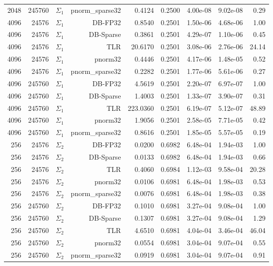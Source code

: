 \begin{tabular}{|r|r|r|r|r|r|r|r|r|}
  2048 & 245760 & $\Sigma_1$ & pnorm\_sparse32 & 0.4124 & 0.2500 & 4.00e-08 & 9.02e-08 & 0.29 \\
  4096 & 24576 & $\Sigma_1$ & DB-FP32 & 0.8540 & 0.2501 & 1.50e-06 & 4.68e-06 & 1.00 \\
  4096 & 24576 & $\Sigma_1$ & DB-Sparse & 0.3861 & 0.2501 & 4.29e-07 & 1.10e-06 & 0.45 \\
  4096 & 24576 & $\Sigma_1$ & TLR & 20.6170 & 0.2501 & 3.08e-06 & 2.76e-06 & 24.14 \\
  4096 & 24576 & $\Sigma_1$ & pnorm32 & 0.4446 & 0.2501 & 4.17e-06 & 1.48e-05 & 0.52 \\
  4096 & 24576 & $\Sigma_1$ & pnorm\_sparse32 & 0.2282 & 0.2501 & 1.77e-06 & 5.61e-06 & 0.27 \\
  4096 & 245760 & $\Sigma_1$ & DB-FP32 & 4.5619 & 0.2501 & 2.20e-07 & 6.97e-07 & 1.00 \\
  4096 & 245760 & $\Sigma_1$ & DB-Sparse & 1.4003 & 0.2501 & 1.33e-07 & 3.90e-07 & 0.31 \\
  4096 & 245760 & $\Sigma_1$ & TLR & 223.0360 & 0.2501 & 6.19e-07 & 5.12e-07 & 48.89 \\
  4096 & 245760 & $\Sigma_1$ & pnorm32 & 1.9056 & 0.2501 & 2.58e-05 & 7.71e-05 & 0.42 \\
  4096 & 245760 & $\Sigma_1$ & pnorm\_sparse32 & 0.8616 & 0.2501 & 1.85e-05 & 5.57e-05 & 0.19 \\
  256 & 24576 & $\Sigma_2$ & DB-FP32 & 0.0200 & 0.6982 & 6.48e-04 & 1.94e-03 & 1.00 \\
  256 & 24576 & $\Sigma_2$ & DB-Sparse & 0.0133 & 0.6982 & 6.48e-04 & 1.94e-03 & 0.66 \\
  256 & 24576 & $\Sigma_2$ & TLR & 0.4060 & 0.6984 & 1.12e-03 & 9.58e-04 & 20.28 \\
  256 & 24576 & $\Sigma_2$ & pnorm32 & 0.0106 & 0.6981 & 6.48e-04 & 1.98e-03 & 0.53 \\
  256 & 24576 & $\Sigma_2$ & pnorm\_sparse32 & 0.0076 & 0.6981 & 6.48e-04 & 1.98e-03 & 0.38 \\
  256 & 245760 & $\Sigma_2$ & DB-FP32 & 0.1010 & 0.6981 & 3.27e-04 & 9.08e-04 & 1.00 \\
  256 & 245760 & $\Sigma_2$ & DB-Sparse & 0.1307 & 0.6981 & 3.27e-04 & 9.08e-04 & 1.29 \\
  256 & 245760 & $\Sigma_2$ & TLR & 4.6510 & 0.6981 & 4.04e-04 & 3.46e-04 & 46.04 \\
  256 & 245760 & $\Sigma_2$ & pnorm32 & 0.0554 & 0.6981 & 3.04e-04 & 9.07e-04 & 0.55 \\
  256 & 245760 & $\Sigma_2$ & pnorm\_sparse32 & 0.0919 & 0.6981 & 3.04e-04 & 9.07e-04 & 0.91 \\

\end{tabular}
